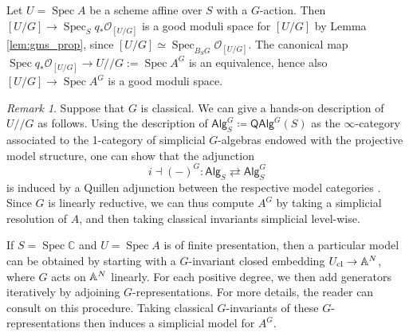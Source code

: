 \documentclass[a4paper,twoside,11pt]{amsart}
\theoremstyle{plain}
\theoremstyle{definition}
\theoremstyle{remark}
\newtheorem{remark}[theorem]{Remark}
\numberwithin{equation}{section}
\newcommand{\CC}{\mathbb{C}} %
\newcommand{\QAlg}{\mathsf{QAlg}}
\newcommand{\Alg}{\mathsf{Alg}}
\DeclareMathOperator{\Spec}{Spec} %
\newcommand{\cl}{\mathrm{cl}} %
\def\git{/\!\!/}
\newcommand{\oO}{\mathcal{O}}
\begin{document}
Let $U = \Spec A$ be a scheme affine over $S$ with a $G$-action. Then $[U/G] \to \Spec_S q_*\oO_{[U/G]}$ is a good moduli space for $[U/G]$ by Lemma \ref{lem:gms_prop}, since $[U/G] \simeq \Spec_{B_SG} \oO_{[U/G]}$. The canonical map $\Spec q_*\oO_{[U/G]} \to U \git G := \Spec A^G$ is an equivalence, hence also $[U/G] \to \Spec A^G$ is a good moduli space.

\begin{remark}
    Suppose that $G$ is classical. We can give a hands-on description of $U \git G$ as follows. Using the description of $\Alg^G_{S} \coloneqq \QAlg^G(S)$ as the $\infty$-category associated to the 1-category of simplicial $G$-algebras endowed with the projective model structure, one can show that the adjunction 
    \[ i \dashv (-)^G \colon \Alg_{S} \rightleftarrows \Alg^G_{S} \]
    is induced by a Quillen adjunction between the respective model categories \cite[\S 3.1]{HRS}. Since $G$ is linearly reductive, we can thus compute $A^G$ by taking a simplicial resolution of $A$, and then taking classical invariants simplicial level-wise. 
    
    If $S = \Spec \CC$ and $U = \Spec A$ is of finite presentation, then a particular model can be obtained by starting with a $G$-invariant closed embedding $U_\cl \to \AA^N$, where $G$ acts on $\AA^N$ linearly. For each positive degree, we then add generators iteratively by adjoining $G$-representations. For more details, the reader can consult \cite[Section~3.7]{HRS} on this procedure. Taking classical $G$-invariants of these $G$-representations then induces a simplicial model for $A^G$.
\end{remark}
\end{document}
